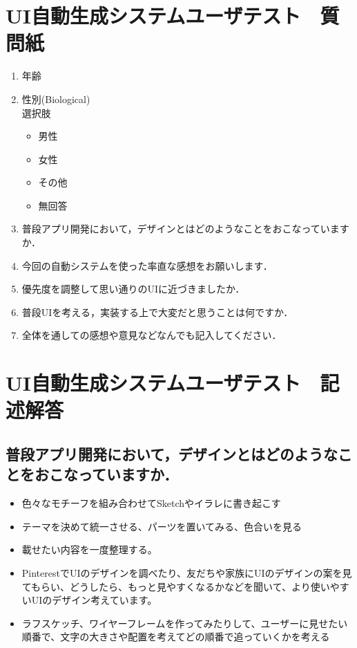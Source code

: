 \chapter{UI自動生成システムユーザテスト　質問紙}
\begin{enumerate}
  \item 年齢
  \item 性別(Biological)
  \\選択肢
 \begin{itemize}
  \item 男性
  \item 女性
  \item その他
  \item 無回答
\end{itemize}
\item 普段アプリ開発において，デザインとはどのようなことをおこなっていますか．
\item 今回の自動システムを使った率直な感想をお願いします．
\item 優先度を調整して思い通りのUIに近づきましたか．
\item 普段UIを考える，実装する上で大変だと思うことは何ですか．
\item 全体を通しての感想や意見などなんでも記入してください．
\end{enumerate}

\chapter{UI自動生成システムユーザテスト　記述解答}

\section{普段アプリ開発において，デザインとはどのようなことをおこなっていますか．}
\begin{itemize}
	\item 色々なモチーフを組み合わせてSketchやイラレに書き起こす
	\item テーマを決めて統一させる、パーツを置いてみる、色合いを見る
	\item 載せたい内容を一度整理する。
	\item PinterestでUIのデザインを調べたり、友だちや家族にUIのデザインの案を見てもらい、どうしたら、もっと見やすくなるかなどを聞いて、より使いやすいUIのデザイン考えています。
	\item ラフスケッチ、ワイヤーフレームを作ってみたりして、ユーザーに見せたい順番で、文字の大きさや配置を考えてどの順番で追っていくかを考える
\end{itemize}

